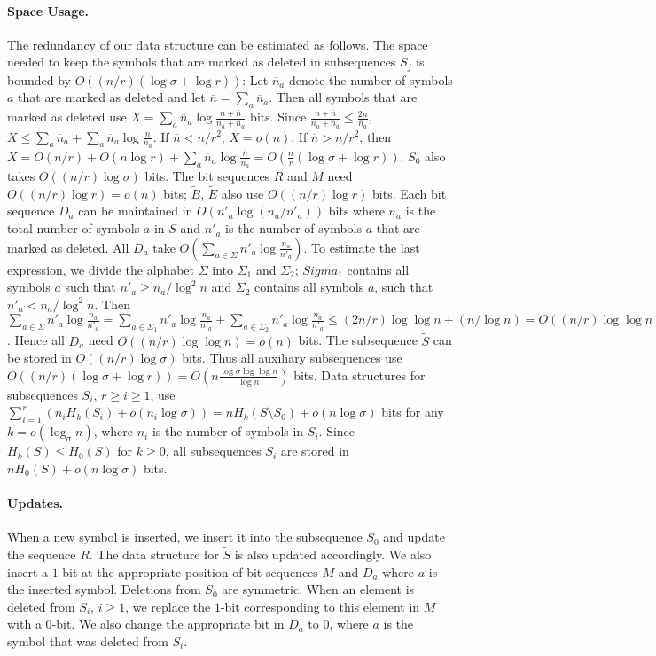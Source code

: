 \documentclass[11pt]{article}\usepackage{fullpage}
\newcommand{\tS}{{\tilde S}}
\newcommand{\tB}{{\tilde B}}
\newcommand{\tE}{{\tilde E}}
\newcommand{\on}{{\overline n}}
\begin{document}
\paragraph{Space Usage.}
The redundancy of our data structure can be estimated as follows. The space needed to keep the symbols that are marked as deleted in subsequences $S_j$ is bounded by $O((n/r)(\log \sigma+\log r))$: Let $\on_a$ denote the number of symbols $a$ that are marked as deleted and let $\on=\sum_a\on_a$. Then all symbols that are marked as deleted use $X=\sum_a\on_a\log\frac{n+\on}{n_a+\on_a}$ bits. Since $\frac{n+\on}{n_a+\on_a}\le \frac{2n}{\on_a}$, $X\le \sum_a\on_a + \sum_a \on_a\log\frac{n}{\on_a}$. If $\on < n/r^2$, $X=o(n)$. If $\on> n/r^2$, then  $X=O(n/r)+ O(n \log r)+\sum_a\on_a\log \frac{\on}{\on_a}= O(\frac{n}{r}(\log\sigma+\log r))$.  $S_0$ also takes $O((n/r)\log \sigma)$ bits.
The bit sequences $R$ and $M$ need $O((n/r)\log r)=o(n)$ bits; $\tB$, $\tE$ also use $O((n/r)\log r)$ bits. 
 Each bit sequence $D_a$ can be maintained in $O(n'_a\log (n_a/n'_a))$ bits where $n_a$ is the total number of symbols $a$ in $S$ and $n'_a$ is the number of symbols $a$ that are marked as deleted. All $D_a$ take $O(\sum_{a\in \Sigma} n'_a \log\frac{n_a}{n'_a})$. To estimate the last expression, we divide the alphabet $\Sigma$ into $\Sigma_1$ and $\Sigma_2$;  $Sigma_1$ contains all symbols $a$ such that $n'_a\ge n_a/\log^2n$ and $\Sigma_2$ contains all symbols $a$, such that $n'_a< n_a/\log^2n$. Then $\sum_{a\in \Sigma}n'_a\log\frac{n_a}{n'_a}=\sum_{a\in \Sigma_1}n'_a\log\frac{n_a}{n'_a}+\sum_{a\in \Sigma_2}n'_a\log\frac{n_a}{n'_a}\le 
(2n/r)\log\log n +(n/\log n)=O((n/r)\log\log n)$. Hence all $D_a$ need 
$O((n/r)\log\log n)=o(n)$ bits.  
The subsequence $\tS$ can be stored in 
$O((n/r)\log \sigma)$ bits. Thus all auxiliary subsequences use 
$O((n/r)(\log\sigma + \log r))=O(n\frac{\log\sigma\log\log n}{\log n})$ bits. 
Data structures for subsequences $S_i$, $r\ge i\ge 1$, use  $\sum_{i=1}^r(n_iH_k(S_i)+o(n_i\log\sigma))=nH_k(S\setminus S_0)+o(n\log\sigma)$ bits for any $k=o(\log_{\sigma}n)$, 
where $n_i$ is the number of symbols in $S_i$.  
Since $H_k(S)\le H_0(S)$ for $k\ge 0$, all subsequences $S_i$ are stored in $nH_0(S)+o(n\log\sigma)$ bits. 


\paragraph{Updates.}
When a new symbol is inserted, we insert it into the subsequence $S_0$ and update the sequence $R$. 
The data structure for $\tS$ is also updated accordingly. We also insert a $1$-bit at the appropriate position of bit sequences $M$ and $D_a$ where $a$ is the inserted symbol. Deletions from $S_0$ are symmetric.  
When an element is deleted from $S_i$, $i\ge 1$, we replace the $1$-bit corresponding to this element in $M$  with a $0$-bit. We also  change the appropriate bit in $D_a$ to $0$, where $a$ is the symbol that was deleted from $S_i$. 
\end{document}
